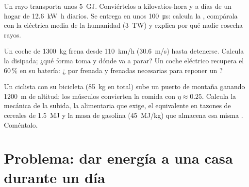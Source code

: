 \begin{exercise}[$\star\star\star$]\label{exo:g10:energy-conservation:13}
Un rayo transporta unos \qty{5}{GJ}. Conviértelos a kilovatios-hora y a
días de un hogar de \qty{12.6}{kW.h} diarios. Se entrega en unos
\qty{100}{\micro s}: calcula la , compárala con la 
eléctrica media de la humanidad (\qty{3}{TW}) y explica por qué nadie
cosecha rayos.
\end{exercise}

\begin{exercise}[$\star\star\star$]\label{exo:g10:energy-conservation:14}
Un coche de \qty{1300}{kg} frena desde \qty{110}{km/h}
(\qty{30.6}{m/s}) hasta detenerse. Calcula la 
disipada; ¿qué forma toma y dónde va a parar? Un coche eléctrico
recupera el $60\,\%$ en su batería: ¿ por frenada y frenadas
necesarias para reponer un ?
\end{exercise}

\begin{exercise}[$\star\star\star$]\label{exo:g10:energy-conservation:15}
Un ciclista con su bicicleta (\qty{85}{kg} en total) sube un puerto de
montaña ganando \qty{1200}{m} de altitud; los músculos convierten la
comida con $\eta \approx 0.25$. Calcula la  mecánica de la
subida, la  alimentaria que exige, el equivalente en tazones de
cereales de \qty{1.5}{MJ} y la masa de gasolina (\qty{45}{MJ/kg}) que
almacena esa misma . Coméntalo.
\end{exercise}

\section{Problema: dar energía a una casa durante un día}

